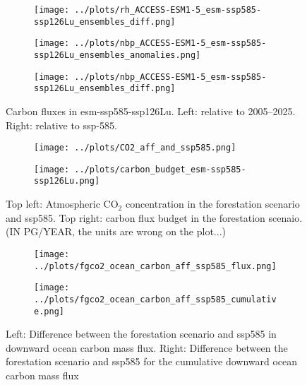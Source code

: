 \documentclass[]{article}
\begin{document}
\begin{figure}[H]
\begin{subfigure}[b]{0.4\linewidth}
    \end{subfigure}
    \begin{subfigure}[b]{0.4\linewidth}
        \texttt{[image: ../plots/rh\_ACCESS-ESM1-5\_esm-ssp585-ssp126Lu\_ensembles\_diff.png]}
    \end{subfigure}
    \begin{subfigure}[b]{0.4\linewidth}
        \texttt{[image: ../plots/nbp\_ACCESS-ESM1-5\_esm-ssp585-ssp126Lu\_ensembles\_anomalies.png]}
    \end{subfigure}
    \begin{subfigure}[b]{0.4\linewidth}
        \texttt{[image: ../plots/nbp\_ACCESS-ESM1-5\_esm-ssp585-ssp126Lu\_ensembles\_diff.png]}
    \end{subfigure}
    \caption{Carbon fluxes in esm-ssp585-ssp126Lu.  Left: relative to 2005–2025. Right: relative to ssp-585.}
    \label{fig:cflux}
\end{figure}

\begin{figure}
    \centering
    \begin{subfigure}[b]{0.4\linewidth}
        \texttt{[image: ../plots/CO2\_aff\_and\_ssp585.png]}
    \end{subfigure}
    \begin{subfigure}[b]{0.4\linewidth}
        \texttt{[image: ../plots/carbon\_budget\_esm-ssp585-ssp126Lu.png]}
    \end{subfigure}
    \caption{Top left: Atmospheric CO$_2$ concentration in the forestation scenario and ssp585. Top right: carbon flux budget in the forestation scenaio. (IN PG/YEAR, the units are wrong on the plot...)}
    \label{fig:atmosphere_carbon}
\end{figure}

\begin{figure}
    \centering
    \begin{subfigure}[b]{0.4\linewidth}
        \texttt{[image: ../plots/fgco2\_ocean\_carbon\_aff\_ssp585\_flux.png]}
    \end{subfigure}
    \begin{subfigure}[b]{0.4\linewidth}
        \texttt{[image: ../plots/fgco2\_ocean\_carbon\_aff\_ssp585\_cumulative.png]}
    \end{subfigure}
    \caption{Left: Difference between the forestation scenario and ssp585 in downward ocean carbon mass flux. Right: Difference between the forestation scenario and ssp585 for the cumulative downward ocean carbon mass flux}
    \label{fig:ocean_carbon}
\end{figure}
\end{document}
